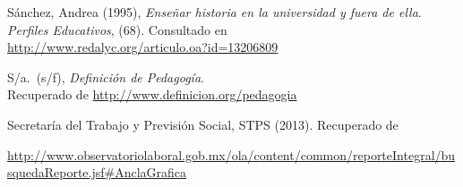 Sánchez, Andrea (1995), \textit{Enseñar historia en la universidad y fuera de 
ella}. \textit{Perfiles Educativos}, (68). Consultado en\\ 
\url{http://www.redalyc.org/articulo.oa?id=13206809}


S\slash{}a.\ (s\slash{}f), \textit{Definición de Pedagogía}.\\ Recuperado de \url{http://www.definicion.org/pedagogia}

Secretaría del Trabajo y Previsión Social, STPS (2013). Recuperado de
\begin{sloppypar}  
\url{http://www.observatoriolaboral.gob.mx/ola/content/common/reporteIntegral/busquedaReporte.jsf#AnclaGrafica} 
\end{sloppypar}
\newpage



